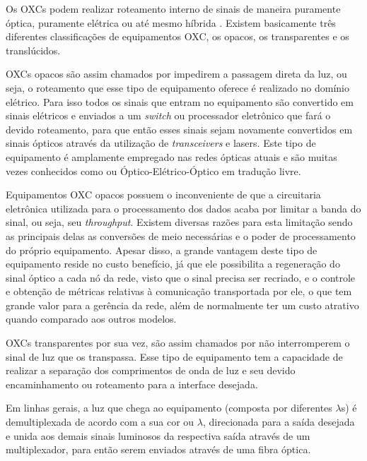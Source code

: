 Os OXCs podem realizar roteamento interno de sinais de maneira puramente óptica, puramente elétrica ou até mesmo híbrida \cite{Book-Ramaswami2010}. Existem basicamente três diferentes classificações de equipamentos OXC, os opacos, os transparentes e os translúcidos.

OXCs opacos são assim chamados por impedirem a passagem direta da luz, ou seja, o roteamento que esse tipo de equipamento oferece é realizado no domínio elétrico. Para isso todos os sinais que entram no equipamento são convertido em sinais elétricos e enviados a um \emph{switch} ou processador eletrônico que fará o devido roteamento, para que então esses sinais sejam novamente convertidos em sinais ópticos através da utilização de \emph{transceivers} e lasers. Este tipo de equipamento é amplamente empregado nas redes ópticas atuais e são muitas vezes conhecidos como  ou Óptico-Elétrico-Óptico em tradução livre.

Equipamentos OXC opacos possuem o inconveniente de que a circuitaria eletrônica utilizada para o processamento dos dados acaba por limitar a banda do sinal, ou seja, seu \emph{throughput}. Existem diversas razões para esta limitação sendo as principais delas as conversões de meio necessárias e o poder de processamento do próprio equipamento. Apesar disso, a grande vantagem deste tipo de equipamento reside no custo benefício, já que ele possibilita a regeneração do sinal óptico a cada nó da rede, visto que o sinal precisa ser recriado, e o controle e obtenção de métricas relativas à comunicação transportada por ele, o que tem grande valor para a gerência da rede, além de normalmente ter um custo atrativo quando comparado aos outros modelos.  

OXCs transparentes por sua vez, são assim chamados por não interromperem o sinal de luz que os transpassa. Esse tipo de equipamento tem a capacidade de realizar a separação dos comprimentos de onda de luz e seu devido encaminhamento ou roteamento para a interface desejada. 

Em linhas gerais, a luz que chega ao equipamento (composta por diferentes $\lambda$s) é demultiplexada de acordo com a sua cor ou $\lambda$, direcionada para a saída desejada e unida aos demais sinais luminosos da respectiva saída através de um multiplexador, para então serem enviados através de uma fibra óptica. 

